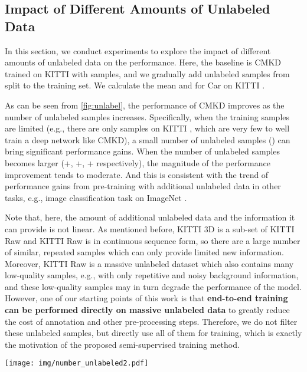 \documentclass[runningheads]{llncs}
\begin{document}
\subsection{Impact of Different Amounts of Unlabeled Data}
\label{sec:num unlabel}
In this section, we conduct experiments to explore the impact of different amounts of unlabeled data on the performance. Here, the baseline is CMKD trained on KITTI  with  samples, and we gradually add unlabeled samples from  split to the training set. We calculate the mean  and  for Car on KITTI .

As can be seen from \cref{fig:unlabel}, the performance of CMKD improves as the number of unlabeled samples increases. 
Specifically, when the training samples are limited (e.g., there are only  samples on KITTI , which are very few to well train a deep network like CMKD), a small number of unlabeled samples () can bring significant performance gains.
When the number of unlabeled samples becomes larger (+, +, + respectively), the magnitude of the performance improvement tends to moderate.
And this is consistent with the trend of performance gains from pre-training with additional unlabeled data in other tasks, e.g., image classification task on ImageNet \cite{imagenet}.

Note that, here, the amount of additional unlabeled data and the information it can provide is not linear. 
As mentioned before, KITTI 3D is a sub-set of KITTI Raw and KITTI Raw is in continuous sequence form, so there are a large number of similar, repeated samples which can only provide limited new information.
Moreover, KITTI Raw is a massive unlabeled dataset which also contains many low-quality samples, e.g., with only repetitive and noisy background information, and these low-quality samples may in turn degrade the performance of the model.
However, one of our starting points of this work is that \textbf{end-to-end training can be performed directly on massive unlabeled data} to greatly reduce the cost of annotation and other pre-processing steps. 
Therefore, we do not filter these unlabeled samples, but directly use all of them for training, which is exactly the motivation of the proposed semi-supervised training method.

\begin{figure*}[t]
  \centering
   \texttt{[image: img/number\_unlabeled2.pdf]}
   \caption{Impact of different amounts of unlabeled data to the performance. We use CMKD trained on KITTI  with  samples as the baseline and gradually add unlabeled samples from  split to the training set. We calculate the mean  and  for Car on KITTI .}
   \label{fig:unlabel}
   \vspace{+5mm}
\end{figure*}
\end{document}

